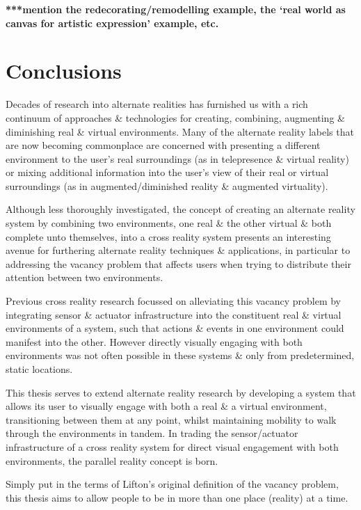 \textbf{***mention the redecorating/remodelling example, the `real world as canvas for artistic expression' example, etc.}


\section{Conclusions}
Decades of research into alternate realities has furnished us with a rich continuum of approaches \& technologies for creating, combining, augmenting \& diminishing real \& virtual environments. Many of the alternate reality labels that are now becoming commonplace are concerned with presenting a different environment to the user's real surroundings (as in telepresence \& virtual reality) or mixing additional information into the user's view of their real or virtual surroundings (as in augmented/diminished reality \& augmented virtuality).

Although less thoroughly investigated, the concept of creating an alternate reality system by combining two environments, one real \& the other virtual \& both complete unto themselves, into a cross reality system presents an interesting avenue for furthering alternate reality techniques \& applications, in particular to addressing the vacancy problem that affects users when trying to distribute their attention between two environments.

Previous cross reality research focussed on alleviating this vacancy problem by integrating sensor \& actuator infrastructure into the constituent real \& virtual environments of a system, such that actions \& events in one environment could manifest into the other. However directly visually engaging with both environments was not often possible in these systems \& only from predetermined, static locations.

This thesis serves to extend alternate reality research by developing a system that allows its user to visually engage with both a real \& a virtual environment, transitioning between them at any point, whilst maintaining mobility to walk through the environments in tandem. In trading the sensor/actuator infrastructure of a cross reality system for direct visual engagement with both environments, the parallel reality concept is born.

Simply put in the terms of Lifton's original definition of the vacancy problem, this thesis aims to allow people to be in more than one place (reality) at a time.